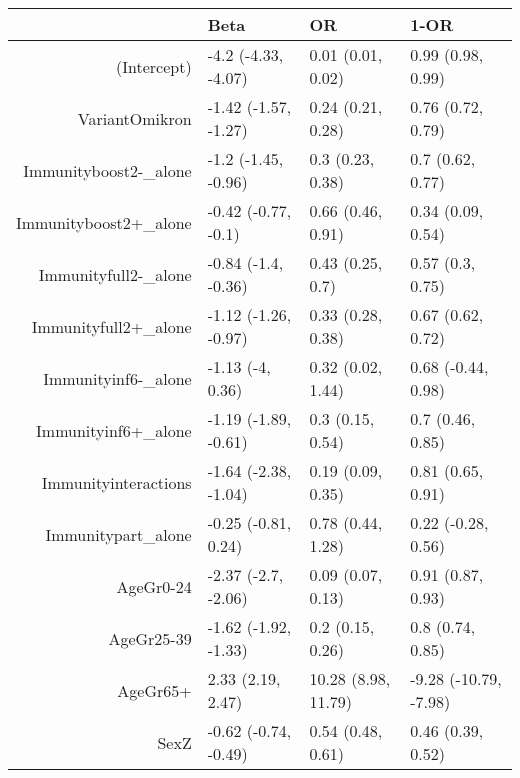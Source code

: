 \begin{table}[ht]
\centering
\begin{tabular}{rlll}
  \hline
 & Beta & OR & 1-OR \\ 
  \hline
(Intercept) & -4.2 (-4.33, -4.07) & 0.01 (0.01, 0.02) & 0.99 (0.98, 0.99) \\ 
  VariantOmikron & -1.42 (-1.57, -1.27) & 0.24 (0.21, 0.28) & 0.76 (0.72, 0.79) \\ 
  Immunityboost2-\_alone & -1.2 (-1.45, -0.96) & 0.3 (0.23, 0.38) & 0.7 (0.62, 0.77) \\ 
  Immunityboost2+\_alone & -0.42 (-0.77, -0.1) & 0.66 (0.46, 0.91) & 0.34 (0.09, 0.54) \\ 
  Immunityfull2-\_alone & -0.84 (-1.4, -0.36) & 0.43 (0.25, 0.7) & 0.57 (0.3, 0.75) \\ 
  Immunityfull2+\_alone & -1.12 (-1.26, -0.97) & 0.33 (0.28, 0.38) & 0.67 (0.62, 0.72) \\ 
  Immunityinf6-\_alone & -1.13 (-4, 0.36) & 0.32 (0.02, 1.44) & 0.68 (-0.44, 0.98) \\ 
  Immunityinf6+\_alone & -1.19 (-1.89, -0.61) & 0.3 (0.15, 0.54) & 0.7 (0.46, 0.85) \\ 
  Immunityinteractions & -1.64 (-2.38, -1.04) & 0.19 (0.09, 0.35) & 0.81 (0.65, 0.91) \\ 
  Immunitypart\_alone & -0.25 (-0.81, 0.24) & 0.78 (0.44, 1.28) & 0.22 (-0.28, 0.56) \\ 
  AgeGr0-24 & -2.37 (-2.7, -2.06) & 0.09 (0.07, 0.13) & 0.91 (0.87, 0.93) \\ 
  AgeGr25-39 & -1.62 (-1.92, -1.33) & 0.2 (0.15, 0.26) & 0.8 (0.74, 0.85) \\ 
  AgeGr65+ & 2.33 (2.19, 2.47) & 10.28 (8.98, 11.79) & -9.28 (-10.79, -7.98) \\ 
  SexZ & -0.62 (-0.74, -0.49) & 0.54 (0.48, 0.61) & 0.46 (0.39, 0.52) \\ 
   \hline
\end{tabular}
\end{table}
